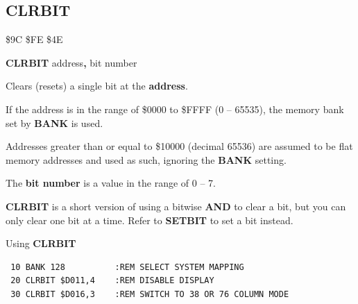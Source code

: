 \subsection{CLRBIT}
\begin{description}[leftmargin=2cm,style=nextline]
\item [Token:] \$9C \$FE \$4E
\item [Format:] {\bf CLRBIT} address{\bf,} bit number
\item [Usage:]  Clears (resets) a single bit at the {\bf address}.

                If the address is in the range of \$0000 to \$FFFF (0 -- 65535), the
                memory bank set by {\bf BANK} is used.

                Addresses greater than or equal to \$10000 (decimal 65536)
                are assumed to be flat memory
                addresses and used as such, ignoring the {\bf BANK} setting.

                The {\bf bit number} is a value in the range of 0 -- 7.

\item [Remarks:] {\bf CLRBIT} is a short version of using a bitwise {\bf AND} to clear a bit,
                 but you can only clear one bit at a time. Refer to {\bf SETBIT} to set a bit instead.

\item [Example:] Using {\bf CLRBIT}

\begin{tcolorbox}[colback=black,coltext=white]
\verbatimfont{\codefont}
\begin{verbatim}
 10 BANK 128          :REM SELECT SYSTEM MAPPING
 20 CLRBIT $D011,4    :REM DISABLE DISPLAY
 30 CLRBIT $D016,3    :REM SWITCH TO 38 OR 76 COLUMN MODE
\end{verbatim}
\end{tcolorbox}
\end{description}


\newpage
